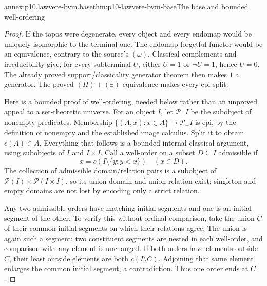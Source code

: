\begin{annexitem}{annex:p10.lawvere-bvm.base}{thm:p10-lawvere-bvm-base}{The base and bounded well-ordering}
\begin{proof}
If the topos were degenerate, every object and every endomap would be
uniquely isomorphic to the terminal one. The endomap forgetful functor
would be an equivalence, contrary to the source's \((\omega)\).
Classical complements and irreducibility give, for every subterminal
\(U\), either \(U=1\) or \(\neg U=1\), hence \(U=0\).
The already proved support/classicality generator theorem then makes
\(1\) a generator. The proved \((\Pi)+(\exists)\) equivalence
makes every epi split.

Here is a bounded proof of well-ordering, needed below rather than an
unproved appeal to a set-theoretic universe. For an object \(I\), let
\(\mathcal P_+I\) be the subobject of nonempty predicates. Membership
\(\{(A,x):x\in A\}\to\mathcal P_+I\) is epi, by the definition
of nonempty and the established image calculus. Split it to obtain
\(c(A)\in A\). Everything that follows is a bounded internal
classical argument, using subobjects of \(I\) and \(I\times I\).
Call a well-order on a subset \(D\subseteq I\) admissible if
\[
       x=c(I\setminus\{y:y<x\})\quad(x\in D).
\]
The collection of admissible domain/relation pairs is a subobject of
\(\mathcal P(I)\times\mathcal P(I\times I)\), so its union
domain and union relation exist; singleton and empty domains are not
lost by encoding only a strict relation.

Any two admissible orders have matching initial segments and one is
an initial segment of the other. To verify this without ordinal
comparison, take the union \(C\) of their common initial segments
on which their relations agree. The union is again such a segment:
two constituent segments are nested in each well-order, and comparison
with any element is unchanged. If both orders have elements outside
\(C\), their least outside elements are both \(c(I\setminus C)\).
Adjoining that same element enlarges the common initial segment, a
contradiction. Thus one order ends at \(C\).


\end{proof}
\end{annexitem}
